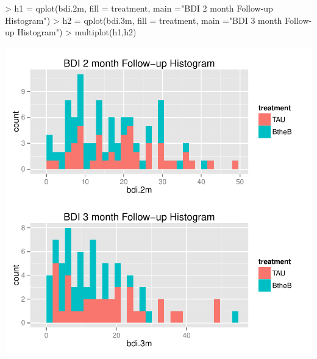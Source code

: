 \documentclass{article}
\begin{document}
\begin{Schunk}
\begin{Sinput}
> h1 = qplot(bdi.2m, fill = treatment, main ="BDI 2 month Follow-up Histogram")
> h2 = qplot(bdi.3m, fill = treatment, main ="BDI 3 month Follow-up Histogram")
> multiplot(h1,h2)
\end{Sinput}
\end{Schunk}
\includegraphics{BtheBteam1-004}
\end{document}

